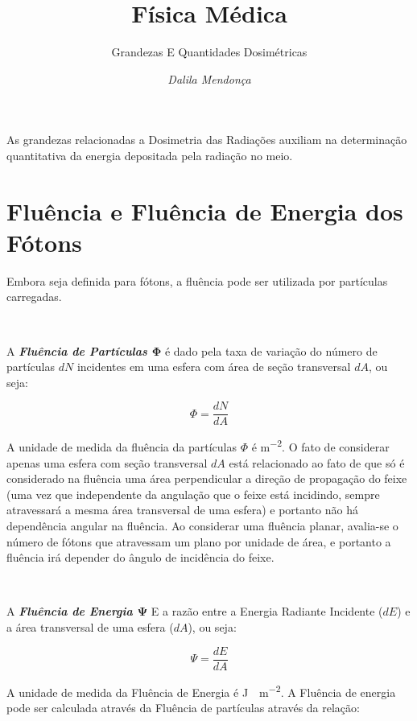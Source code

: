 \documentclass[11pt,a4paper]{article}
\title{Física Médica}
\author{Grandezas E Quantidades Dosimétricas\nocite{*}}
\date{\textit{Dalila Mendonça}}
\begin{document}
	\maketitle

    As grandezas relacionadas a Dosimetria das Radiações auxiliam na determinação quantitativa da energia depositada pela radiação no meio. 
    
    
    \section{Fluência e Fluência de Energia dos Fótons}

        Embora seja definida para fótons, a fluência pode ser utilizada por partículas carregadas. 

        \

        A \textit{\textbf{\textcolor{CarnationPink}{Fluência de Partículas $\mathbf{\Phi}$}}} é dado pela taxa de variação do número de partículas $dN$ incidentes em uma esfera com área de seção transversal $dA$, ou seja:

			\begin{equation}
			\Phi  = \frac{d N}{d A} 
			\end{equation}

    	\noindent A unidade de medida da fluência da partículas	$\Phi$ é \unit{m^{-2}}. O fato de considerar apenas uma esfera com seção transversal $dA$ está relacionado ao fato de que só é considerado na fluência uma área perpendicular a direção de propagação do feixe (uma vez que independente da angulação que o feixe está incidindo, sempre atravessará a mesma área transversal de uma esfera) e portanto não há dependência angular na fluência. Ao considerar uma fluência planar, avalia-se o número de fótons que atravessam um plano por unidade de área, e portanto a fluência irá depender do ângulo de incidência do feixe. 

      	\

      	A \textit{\textbf{\textcolor{CarnationPink}{Fluência de Energia $\mathbf{\Psi}$}}} E a razão entre a Energia Radiante Incidente ($dE$) e a área transversal de uma esfera ($dA$), ou seja:

			\begin{equation}
			\Psi = \frac{d E}{d A}
			\end{equation}

      	\noindent A unidade de medida da Fluência de Energia é \unit{J \cdot m^{-2}}. A Fluência de energia pode ser calculada através da Fluência de partículas através da relação:
\end{document}
